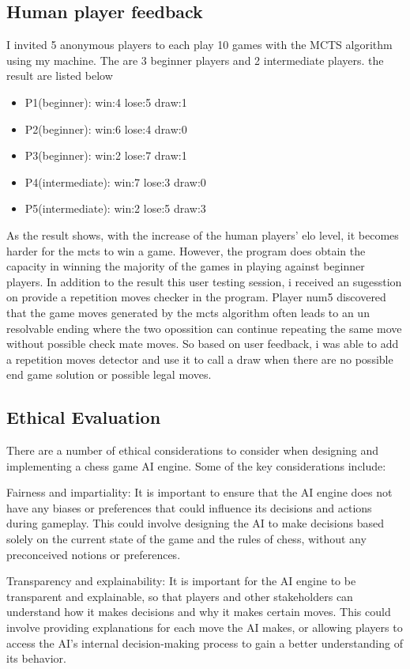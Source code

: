 \documentclass[10pt,twocolumn]{article}
\begin{document}
\subsection{Human player feedback}
    I invited 5 anonymous players to each play 10 games with the MCTS algorithm using my machine. The are 3 beginner players and 2 intermediate players. the result are listed below 
    \begin{itemize}
        \item P1(beginner): win:4 lose:5 draw:1
        \item P2(beginner): win:6 lose:4 draw:0
        \item P3(beginner): win:2 lose:7 draw:1
        \item P4(intermediate): win:7 lose:3 draw:0
        \item P5(intermediate): win:2 lose:5 draw:3
    \end{itemize}
    As the result shows, with the increase of the human players' elo level, it becomes harder for the mcts to win a game. However, the program does obtain the capacity in winning the majority of the games in playing against beginner players. In addition to the result this user testing session, i received an sugesstion on provide a repetition moves checker in the program. Player num5 discovered that the game moves generated by the mcts algorithm often leads to an un resolvable ending where the two opossition can continue repeating the same move without possible check mate moves. So based on user feedback, i was able to add a repetition moves detector and use it to call a draw when there are no possible end game solution or possible legal moves. 

    
    
\subsection{Ethical Evaluation}
There are a number of ethical considerations to consider when designing and implementing a chess game AI engine. Some of the key considerations include:

Fairness and impartiality: It is important to ensure that the AI engine does not have any biases or preferences that could influence its decisions and actions during gameplay. This could involve designing the AI to make decisions based solely on the current state of the game and the rules of chess, without any preconceived notions or preferences.

Transparency and explainability: It is important for the AI engine to be transparent and explainable, so that players and other stakeholders can understand how it makes decisions and why it makes certain moves. This could involve providing explanations for each move the AI makes, or allowing players to access the AI's internal decision-making process to gain a better understanding of its behavior.
\end{document}
